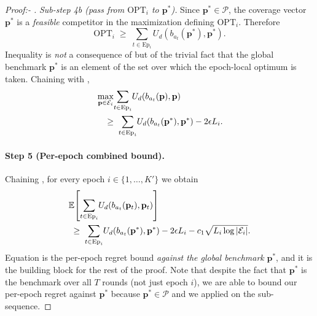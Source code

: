 \documentclass[letterpaper,9pt,twocolumn]{extarticle}
\newcommand{\pvec}{\mathbf{p}}
\newcommand{\cP}{\mathcal{P}}
\newcommand{\cE}{\mathcal{E}}
\newcommand{\EE}{\mathbb{E}}
\theoremstyle{plain}
\theoremstyle{definition}
\theoremstyle{remark}
\begin{document}
\begin{proof}[Proof:- ]
\emph{Sub-step 4b (pass from $\mathrm{OPT}_i$ to $\pvec^{*}$).}
Since $\pvec^{*}\in\cP$, the coverage vector $\pvec^{*}$ is a \emph{feasible}
competitor in the maximization defining $\mathrm{OPT}_i$. Therefore
\begin{equation}
\mathrm{OPT}_i\;\ge\;\sum_{t\in\mathrm{Ep}_i}\!U_d(b_{a_t}(\pvec^{*}),\pvec^{*}).
\label{eq:opt-vs-pstar}
\end{equation}
Inequality  is \emph{not} a consequence of
 but of the trivial fact that the global benchmark
$\pvec^{*}$ is an element of the set over which the epoch-local optimum
is taken. Chaining  with ,
\begin{align}
&\max_{\pvec\in\cE_i}\!\sum_{t\in\mathrm{Ep}_i}\!U_d(b_{a_t}(\pvec),\pvec)\notag\\
&\quad\ge\;\sum_{t\in\mathrm{Ep}_i}\!U_d(b_{a_t}(\pvec^{*}),\pvec^{*})-2\epsilon L_i.
\label{eq:lem43-pstar}
\end{align}


\paragraph{Step 5 (Per-epoch combined bound).}
Chaining , for every epoch
$i\in\{1,\dots,K'\}$ we obtain
\begin{align}
&\EE\!\left[\sum_{t\in\mathrm{Ep}_i}\!U_d(b_{a_t}(\pvec_t),\pvec_t)\right]\notag\\
&\;\ge\;\sum_{t\in\mathrm{Ep}_i}\!U_d(b_{a_t}(\pvec^{*}),\pvec^{*})-2\epsilon L_i-c_1\sqrt{L_i\log|\cE_i|}.\label{eq:combined-epoch}
\end{align}
Equation  is the per-epoch regret bound
\emph{against the global benchmark} $\pvec^{*}$, and it is the building
block for the rest of the proof. Note that despite the fact that
$\pvec^{*}$ is the benchmark over all $T$ rounds (not just epoch $i$),
we are able to bound our per-epoch regret against $\pvec^{*}$ because
$\pvec^{*}\in\cP$ and we applied  on the sub-sequence.


\end{proof}
\end{document}
